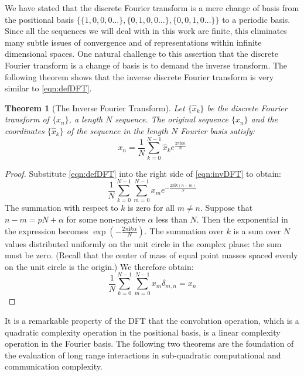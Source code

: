 \documentclass{article}
\newcommand{\ii}{\mathbf{i}}
\newtheorem{theorem}{Theorem}[section]
\theoremstyle{definition}
\begin{document}
We have stated that the discrete Fourier transform is a mere change of basis
from the positional basis $\{\{1,0,0,0\dots\}, \{0,1,0,0\dots\},
\{0,0,1,0\dots\}\}$ to a periodic basis. Since all the sequences we will deal
with in this work are finite, this eliminates many subtle issues of convergence
and of representations within infinite dimensional spaces. One natural challenge
to this assertion that the discrete Fourier transform is a change of basis is to
demand the inverse transform. The following theorem shows that the inverse
discrete Fourier transform is very similar to \eqref{eqn:defDFT}.
\begin{theorem}[The Inverse Fourier Transform]
Let $\{\hat{x}_k\}$ be the discrete Fourier transform of $\{x_n\}$, a length $N$
sequence. The original sequence $\{x_n\}$ and the coordinates $\{\hat{x}_k\}$ of
the sequence in the length $N$ Fourier basis satisfy:
\begin{equation}\label{eqn:invDFT}
  x_n = \frac{1}{N} \sum_{k=0}^{N-1} \hat{x}_k e^{\frac{2 \pi \ii k n}{N}}
\end{equation}
\end{theorem}
\begin{proof}
Substitute \eqref{eqn:defDFT} into the right side of \eqref{eqn:invDFT} to
obtain:
\begin{displaymath}
  \frac{1}{N} \sum_{k=0}^{N-1} \sum_{m=0}^{N-1} x_m e^{-\frac{2 \pi \ii k (n -
m)}{N}}
\end{displaymath}
The summation with respect to $k$ is zero for all $m \not= n$. Suppose that $n -
m = pN + \alpha$ for some non-negative $\alpha$ less than $N$. Then the
exponential in the expression becomes $\exp ( - \frac{2\pi \ii k \alpha}{N} )$.
The summation over $k$ is a sum over $N$ values distributed uniformly on the
unit circle in the complex plane: the sum must be zero. (Recall that the center of
mass of equal point masses spaced evenly on the unit circle is the origin.) We
therefore obtain:
\begin{displaymath}
  \frac{1}{N} \sum_{k=0}^{N-1} \sum_{m=0}^{N-1} x_m \delta_{m,n} = x_n
\end{displaymath}
\end{proof}

It is a remarkable property of the DFT that the convolution operation, which is
a quadratic complexity operation in the positional basis, is a linear complexity
operation in the Fourier basis. The following two theorems are the foundation of
the evaluation of long range interactions in sub-quadratic computational and
communication complexity.
\end{document}

